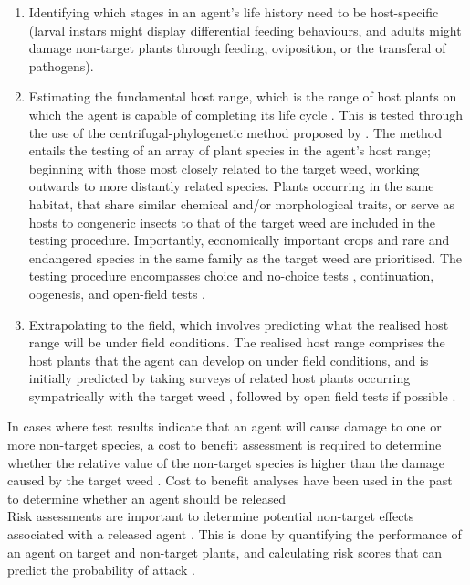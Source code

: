 \begin{enumerate}
    \item Identifying which stages in an agent's life history need to be host-specific
(larval instars might display differential feeding behaviours, and adults might damage non-target plants through feeding, oviposition, or the transferal of pathogens).
\item Estimating the fundamental host range, which is the range of host plants on which the agent is capable of completing its life cycle \citep{schaffner2001host}. This is tested through the use of the centrifugal-phylogenetic method proposed by \citet{wapshere1974strategy}. The method entails the testing of an array of plant species in the agent's host range; beginning with those most closely related to the target weed, working outwards to more distantly related species. Plants occurring in the same habitat, that share similar chemical and/or morphological traits, or serve as hosts to congeneric insects to that of the target weed are included in the testing procedure. Importantly, economically important crops and rare and endangered species in the same family as the target weed are prioritised. The testing procedure encompasses choice and no-choice tests \citep{schaffner2001host}, continuation, oogenesis, and open-field tests \citep{VanDriesche2009, Schaffner2018}.
\item Extrapolating to the field, which involves predicting what the realised host range will be under field conditions. The realised host range comprises the host plants that the agent can develop on under field conditions, and is initially predicted by taking surveys of related host plants occurring sympatrically with the target weed \citep{schaffner2001host}, followed by open field tests if possible \citep{balciunas1996comparison}.
\end{enumerate}
\vspace{0.4cm}
In cases where test results indicate that an agent will cause damage to one or more non-target species, a cost to benefit assessment is required to determine whether the relative value of the non-target species is higher than the damage caused by the target weed \citep{mcfadyen1998biological, VanDriesche2009}. Cost to benefit analyses have been used in the past to determine whether an agent should be released \citep{mcfadyen1990leaf, olckers1995interpreting, cristofaro1998biology, haye2006controlling} \\
Risk assessments are important to determine potential non-target effects associated with a released agent \citep{paynter2015relative, paynter2018making, hinz2019safe}. This is done by quantifying the performance of an agent on target and non-target plants, and calculating risk scores that can predict the probability of attack \citep{paynter2015relative}.

